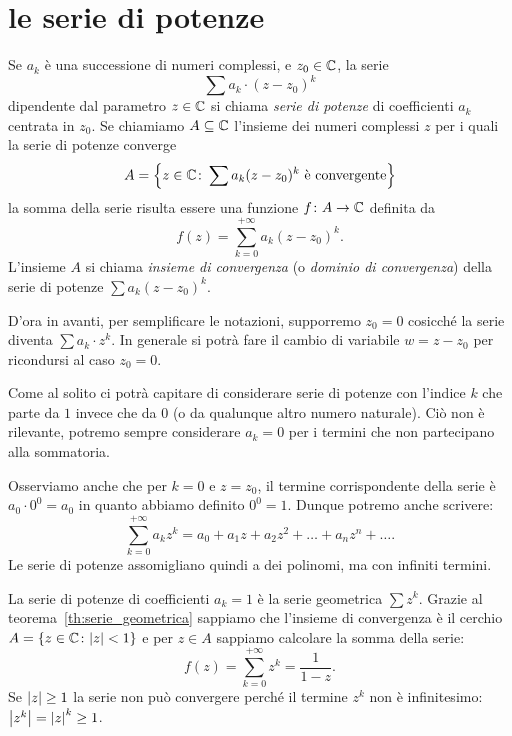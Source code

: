 \section{le serie di potenze}

Se $a_k$ è una successione di numeri complessi, e $z_0\in {\mathbb C}$, 
la serie
\[
 \sum a_k \cdot (z-z_0)^k
\]
dipendente dal parametro $z\in {\mathbb C}$ si chiama
\emph{serie di potenze}%
%
di coefficienti $a_k$ centrata in $z_0$.
Se chiamiamo $A\subseteq {\mathbb C}$ l'insieme dei numeri complessi $z$
per i quali la serie di potenze converge
\[
A= {\left\{ z\in {\mathbb C} \colon \sum a_k (z-z_0)^k \text{ è convergente} \right\}}
\]
la somma della serie risulta essere una funzione
$f \colon A \to {\mathbb C}$ definita da
\[
  f(z) = \sum_{k=0}^{+\infty} a_k (z-z_0)^k.
\]
L'insieme $A$ si chiama \emph{insieme di convergenza}%
%
(o \emph{dominio di convergenza}) della serie
di potenze $\sum a_k (z-z_0)^k$.

D'ora in avanti, per semplificare le notazioni, 
supporremo $z_0=0$ cosicché 
la serie diventa $\sum a_k \cdot z^k$. 
In generale si potrà fare il cambio di variabile $w=z-z_0$ 
per ricondursi al caso $z_0=0$.

Come al solito ci potrà capitare di considerare serie
di potenze con l'indice $k$ che parte da $1$ invece che da $0$
(o da qualunque altro numero naturale).
Ciò non è rilevante, potremo sempre considerare $a_k=0$ per i termini
che non partecipano alla sommatoria.

Osserviamo anche che per $k=0$ e $z=z_0$, 
il termine corrispondente della serie è
$a_0 \cdot 0^0 = a_0$ in
quanto abbiamo definito $0^0=1$. Dunque potremo anche scrivere:
\[
  \sum_{k=0}^{+\infty} a_k z^k = a_0 + a_1 z + a_2 z^2 + \dots + a_n z^n + \dots.
\]
Le serie di potenze assomigliano quindi a dei polinomi, ma con infiniti termini.

\begin{example}
La serie di potenze di coefficienti $a_k=1$ è la
serie geometrica $\sum z^k$.
Grazie al teorema~\ref{th:serie_geometrica} 
sappiamo che l'insieme di convergenza è il cerchio
$A={\left\{ z\in {\mathbb C} \colon {\left|z\right|}<1 \right\}}$
e per $z\in A$ sappiamo calcolare la somma della serie:
\[
 f(z) = \sum_{k=0}^{+\infty} z^k  = \frac{1}{1-z}.
\]
Se ${\left|z\right|}\ge 1$ la serie non può convergere perché il termine $z^k$ non è
infinitesimo: ${\left|z^k\right|} = {\left|z\right|}^k \ge 1$.
\end{example}

